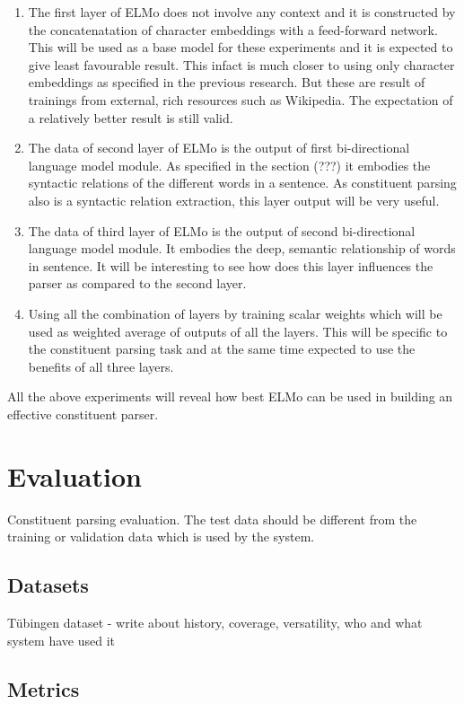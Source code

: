 \documentclass[a4paper, 11pt]{article}
\begin{document}
\begin{enumerate}
\item The first layer of ELMo does not involve any context and it is constructed by the concatenatation of character embeddings with a feed-forward network. This will be used as a base model for these experiments and it is expected to give least favourable result. This infact is much closer to using only character embeddings as specified in the previous research. But these are result of trainings from external, rich resources such as Wikipedia. The expectation of a relatively better result is still valid.
\item The data of second layer of ELMo is the output of first bi-directional language model module. As specified in the section (???) it embodies the syntactic relations of the different words in a sentence. As constituent parsing also is a syntactic relation extraction, this layer output will be very useful. 
\item The data of third layer of ELMo is the output of second bi-directional language model module. It embodies the deep, semantic relationship of words in sentence. It will be interesting to see how does this layer influences the parser as compared to the second layer.   
\item Using all the combination of layers by training scalar weights which will be used as weighted average of outputs of all the layers. This will be specific to the constituent parsing task and at the same time expected to use the benefits of all three layers. 
\end{enumerate}

All the above experiments will reveal how best ELMo can be used in building an effective constituent parser. 

\pagebreak
\section{Evaluation}

Constituent parsing evaluation. The test data should be different from the training or validation data which is used by the system. 

\subsection{Datasets}

Tübingen dataset - write about history, coverage, versatility, who and what system have used it 


\subsection{Metrics}
\end{document}
